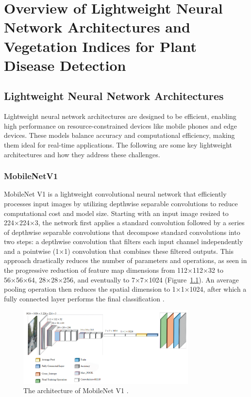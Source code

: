 \chapter{Overview of Lightweight Neural Network Architectures and Vegetation Indices for Plant Disease Detection}%
\label{app:annexA}



\section{Lightweight Neural Network Architectures}
Lightweight neural network architectures are designed to be efficient, enabling high performance on resource-constrained devices like mobile phones and edge devices. These models balance accuracy and computational efficiency, making them ideal for real-time applications. The following are some key lightweight architectures and how they address these challenges.


\subsection{MobileNetV1}
MobileNet V1 is a lightweight convolutional neural network that efficiently processes input images by utilizing depthwise separable convolutions to reduce computational cost and model size. Starting with an input image resized to 224×224×3, the network first applies a standard convolution followed by a series of depthwise separable convolutions that decompose standard convolutions into two steps: a depthwise convolution that filters each input channel independently and a pointwise (1×1) convolution that combines these filtered outputs. This approach drastically reduces the number of parameters and operations, as seen in the progressive reduction of feature map dimensions from 112×112×32 to 56×56×64, 28×28×256, and eventually to 7×7×1024 (Figure~\ref{fig:MobileNet}). An average pooling operation then reduces the spatial dimension to 1×1×1024, after which a fully connected layer performs the final classification \parencite{kadam2022efficient}.

\begin{figure}[H] %
    \centering
    \includegraphics[width=0.8\textwidth]{appendices/images/MobileNet.png}
    \caption{The architecture of MobileNet V1 \parencite{kadam2022efficient}.}
    \label{fig:MobileNet}
\end{figure}


